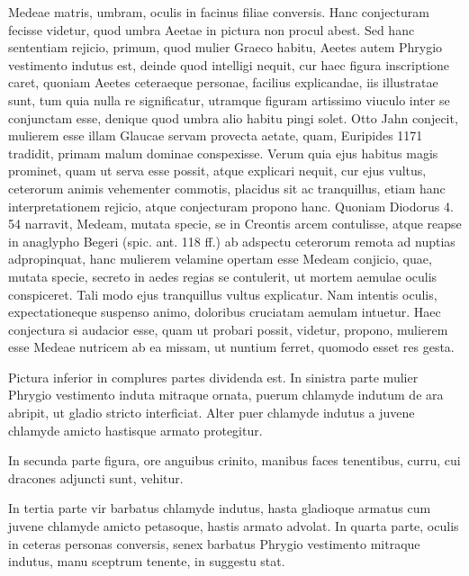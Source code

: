 \documentclass[landscape, a4paper, 11pt, oneside, polutonikogreek, german]{article}
\begin{document}
Medeae matris, umbram, oculis in facinus filiae conversis. Hanc conjecturam fecisse videtur, quod umbra Aeetae in pictura non procul abest. Sed hanc sententiam rejicio, primum, quod mulier Graeco habitu, Aeetes autem Phrygio vestimento indutus est, deinde quod intelligi nequit, cur haec figura inscriptione caret, quoniam Aeetes ceteraeque personae, facilius explicandae, iis illustratae sunt, tum quia nulla re significatur, utramque figuram artissimo viuculo inter se conjunctam esse, denique quod umbra alio habitu pingi solet. Otto Jahn conjecit, mulierem esse illam Glaucae servam provecta aetate, quam, Euripides 1171 tradidit, primam malum dominae conspexisse. Verum quia ejus habitus magis prominet, quam ut serva esse possit, atque explicari nequit, cur ejus vultus, ceterorum animis vehementer commotis, placidus sit ac tranquillus, etiam hanc interpretationem rejicio, atque conjecturam propono hanc. Quoniam Diodorus 4. 54 narravit, Medeam, mutata specie, se in Creontis arcem contulisse, atque reapse in anaglypho Begeri (spic. ant. 118 ff.) ab adspectu ceterorum remota ad nuptias adpropinquat, hanc mulierem velamine opertam esse Medeam conjicio, quae, mutata specie, secreto in aedes regias se contulerit, ut mortem aemulae oculis conspiceret. Tali modo ejus tranquillus vultus explicatur. Nam intentis oculis, expectationeque suspenso animo, doloribus cruciatam aemulam intuetur. Haec conjectura si audacior esse, quam ut probari possit, videtur, propono, mulierem esse Medeae nutricem ab ea missam, ut nuntium ferret, quomodo esset res gesta.

Pictura inferior in complures partes dividenda est. In sinistra parte mulier Phrygio vestimento induta mitraque ornata, puerum chlamyde indutum de ara abripit, ut gladio stricto interficiat. Alter puer chlamyde indutus a juvene chlamyde amicto hastisque armato protegitur.

In secunda parte figura, ore anguibus crinito, manibus faces tenentibus, curru, cui dracones adjuncti sunt, vehitur.

In tertia parte vir barbatus chlamyde indutus, hasta gladioque armatus cum juvene chlamyde amicto petasoque, hastis armato advolat. In quarta parte, oculis in ceteras personas conversis, senex barbatus Phrygio vestimento mitraque indutus, manu sceptrum tenente, in suggestu stat.
\end{document}

